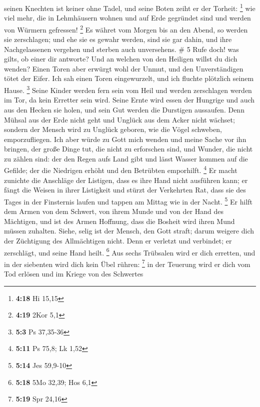 seinen Knechten ist keiner ohne Tadel, und seine Boten zeiht er der
Torheit: \footnote{\textbf{4:18} Hi 15,15}  wie viel
mehr, die in Lehmhäusern wohnen und auf Erde gegründet sind und werden
von Würmern gefressen! \footnote{\textbf{4:19} 2Kor 5,1} 
Es währet vom Morgen bis an den Abend, so werden sie zerschlagen; und
ehe sie es gewahr werden, sind sie gar dahin,  und ihre
Nachgelassenen vergehen und sterben auch unversehens. \# 5
 Rufe doch! was gilts, ob einer dir antworte? Und an
welchen von den Heiligen willst du dich wenden?  Einen
Toren aber erwürgt wohl der Unmut, und den Unverständigen tötet der
Eifer.  Ich sah einen Toren eingewurzelt, und ich fluchte
plötzlich seinem Hause. \footnote{\textbf{5:3} Ps 37,35-36}
 Seine Kinder werden fern sein vom Heil und werden
zerschlagen werden im Tor, da kein Erretter sein wird. 
Seine Ernte wird essen der Hungrige und auch aus den Hecken sie holen,
und sein Gut werden die Durstigen aussaufen.  Denn Mühsal
aus der Erde nicht geht und Unglück aus dem Acker nicht wächset;
 sondern der Mensch wird zu Unglück geboren, wie die Vögel
schweben, emporzufliegen.  Ich aber würde zu Gott mich
wenden und meine Sache vor ihn bringen,  der große Dinge
tut, die nicht zu erforschen sind, und Wunder, die nicht zu zählen sind:
 der den Regen aufs Land gibt und lässt Wasser kommen auf
die Gefilde;  der die Niedrigen erhöht und den Betrübten
emporhilft. \footnote{\textbf{5:11} Ps 75,8; Lk 1,52}  Er
macht zunichte die Anschläge der Listigen, dass es ihre Hand nicht
ausführen kann;  er fängt die Weisen in ihrer Listigkeit
und stürzt der Verkehrten Rat,  dass sie des Tages in der
Finsternis laufen und tappen am Mittag wie in der Nacht. \footnote{\textbf{5:14}
  Jes 59,9-10}  Er hilft dem Armen von dem Schwert, von
ihrem Munde und von der Hand des Mächtigen,  und ist des
Armen Hoffnung, dass die Bosheit wird ihren Mund müssen zuhalten.
 Siehe, selig ist der Mensch, den Gott straft; darum
weigere dich der Züchtigung des Allmächtigen nicht.  Denn
er verletzt und verbindet; er zerschlägt, und seine Hand heilt.
\footnote{\textbf{5:18} 5Mo 32,39; Hos 6,1}  Aus sechs
Trübsalen wird er dich erretten, und in der siebenten wird dich kein
Übel rühren: \footnote{\textbf{5:19} Spr 24,16}  in der
Teuerung wird er dich vom Tod erlösen und im Kriege von des Schwertes
